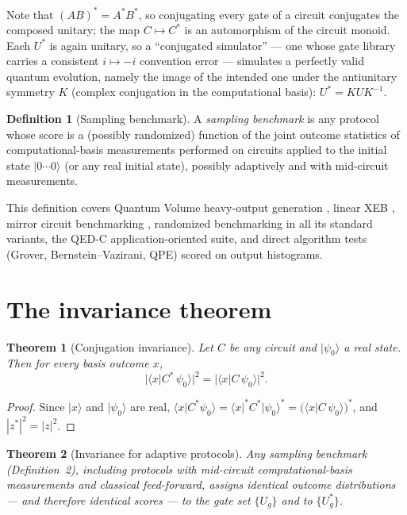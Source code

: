 \documentclass[11pt]{article}
\newtheorem{theorem}{Theorem}
\theoremstyle{definition}
\newtheorem{definition}{Definition}
\theoremstyle{remark}
\newcommand{\ket}[1]{\lvert #1 \rangle}
\newcommand{\bra}[1]{\langle #1 \rvert}
\newcommand{\braket}[2]{\langle #1 \vert #2 \rangle}
\begin{document}
Note that $(AB)^{*}=A^{*}B^{*}$, so conjugating every gate of a circuit
conjugates the composed unitary; the map $C \mapsto C^{*}$ is an
automorphism of the circuit monoid. Each $U^{*}$ is again unitary, so a
``conjugated simulator'' --- one whose gate library carries a consistent
$i \mapsto -i$ convention error --- simulates a perfectly valid quantum
evolution, namely the image of the intended one under the antiunitary
symmetry $K$ (complex conjugation in the computational basis):
$U^{*} = K U K^{-1}$.

\begin{definition}[Sampling benchmark]
A \emph{sampling benchmark} is any protocol whose score is a
(possibly randomized) function of the joint outcome statistics of
computational-basis measurements performed on circuits applied to the
initial state $\ket{0\cdots 0}$ (or any real initial state), possibly
adaptively and with mid-circuit measurements.
\end{definition}

This definition covers Quantum Volume heavy-output generation
\cite{cross2019}, linear XEB \cite{arute2019}, mirror circuit
benchmarking \cite{proctor2022}, randomized benchmarking in all its
standard variants, the QED-C application-oriented suite, and direct
algorithm tests (Grover, Bernstein--Vazirani, QPE) scored on output
histograms.

\section{The invariance theorem}

\begin{theorem}[Conjugation invariance]\label{thm:main}
Let $C$ be any circuit and $\ket{\psi_{0}}$ a real state. Then for every
basis outcome $x$,
\[
\bigl|\braket{x}{C^{*}\,\psi_{0}}\bigr|^{2}
= \bigl|\braket{x}{C\,\psi_{0}}\bigr|^{2}.
\]
\end{theorem}

\begin{proof}
Since $\ket{x}$ and $\ket{\psi_{0}}$ are real,
$\braket{x}{C^{*}\psi_{0}}
= \bra{x}^{*} C^{*} \ket{\psi_{0}}^{*}
= \bigl(\braket{x}{C\,\psi_{0}}\bigr)^{*}$,
and $|z^{*}|^{2}=|z|^{2}$.
\end{proof}

\begin{theorem}[Invariance for adaptive protocols]\label{thm:adaptive}
Any sampling benchmark (Definition~2), including protocols with
mid-circuit computational-basis measurements and classical feed-forward,
assigns identical outcome distributions --- and therefore identical
scores --- to the gate set $\{U_{g}\}$ and to $\{U_{g}^{*}\}$.
\end{theorem}
\end{document}
